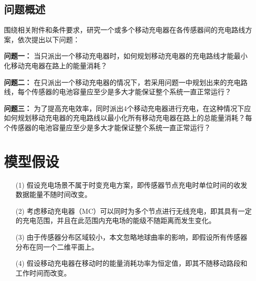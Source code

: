 \documentclass{whutmod}
\begin{document}
        \subsection{问题概述}
            围绕相关附件和条件要求，研究一个或多个移动充电器在各传感器间的充电路线方案，依次提出以下问题：

            \textbf{问题一：} 当只派出一个移动充电器时，如何规划移动充电器的充电路线才能最小化移动充电器在路上的能量消耗？

            \textbf{问题二：} 在只派出一个移动充电器的情况下，若采用问题一中规划出来的充电路线，每个传感器的电池容量应至少是多大才能保证整个系统一直正常运行？

            \textbf{问题三：} 为了提高充电效率，同时派出4个移动充电器进行充电，在这种情况下应如何规划移动充电器的充电路线以最小化所有移动充电器在路上的总能量消耗？每个传感器的电池容量应至少是多大才能保证整个系统一直正常运行？

    \section{模型假设}
        \begin{itemize}
            \item[(1)] 假设充电场景不属于时变充电方案，即传感器节点充电时单位时间的收发数据能量不随时间改变。
            \item[(2)] 考虑移动充电器（MC）可以同时为多个节点进行无线充电，即其具有一定的充电范围，并且在此范围内充电场的能级不随距离而发生变化。
            \item[(3)] 由于传感器分布区域较小，本文忽略地球曲率的影响，即假设所有传感器分布在同一个二维平面上。
            \item[(4)] 假设移动充电器在移动时的能量消耗功率为恒定值，即其不随移动路段和工作时间而改变。
        \end{itemize}

\end{document}
